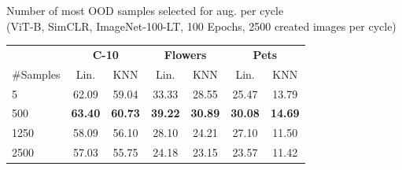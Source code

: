 \centering
\setlength{\tabcolsep}{2pt}
\caption{\centering Number of most OOD samples selected for aug.  per cycle\\(ViT-B, SimCLR, ImageNet-100-LT, 100 Epochs, 2500 created images per cycle)}
{\begin{tabular}{l cc cc cc}
    \toprule
      & \multicolumn{2}{c}{\textbf{C-10}} &  \multicolumn{2}{c}{\textbf{Flowers}} &  \multicolumn{2}{c}{\textbf{Pets}} \\
     \cmidrule(r){2-3}
     \cmidrule(l){4-5}
     \cmidrule(l){6-7}
     \#Samples  & Lin. & KNN & Lin. & KNN & Lin. & KNN \\
    \toprule
    
    \multirow{1}{*}{5} & 62.09  &  59.04 & 33.33 & 28.55 & 25.47 & 13.79 \\  
    \multirow{1}{*}{500} & \textbf{63.40} & \textbf{60.73} & \textbf{39.22} & \textbf{30.89} & \textbf{30.08} & \textbf{14.69}\\
    \multirow{1}{*}{1250} & 58.09 & 56.10 & 28.10 & 24.21 & 27.10 & 11.50 \\
    \multirow{1}{*}{2500} & 57.03   &  55.75 & 24.18 & 23.15 & 23.57 & 11.42 \\ 
    
    \bottomrule
\end{tabular}
\label{table:n_samples_abl}}